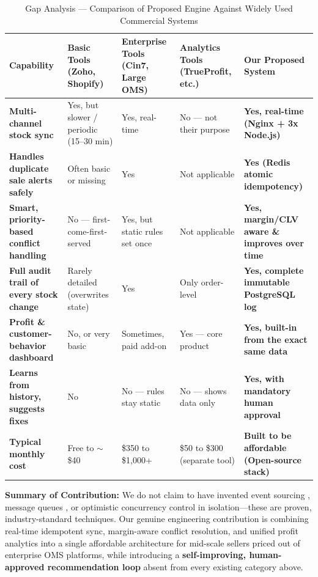 \documentclass[oneside,a4paper,12pt]{report}
\begin{document}
\begin{table}[!htbp]
\centering
\footnotesize
\renewcommand{\arraystretch}{1.4}
\begin{tabularx}{\textwidth}{|p{3.1cm}|X|X|X|X|}
\hline
\textbf{Capability} & \textbf{Basic Tools (Zoho, Shopify)} & \textbf{Enterprise Tools (Cin7, Large OMS)} & \textbf{Analytics Tools (TrueProfit, etc.)} & \textbf{Our Proposed System} \\ \hline
\textbf{Multi-channel stock sync} & Yes, but slower / periodic (15--30 min) & Yes, real-time & No — not their purpose & \textbf{Yes, real-time (Nginx + 3x Node.js)} \\ \hline
\textbf{Handles duplicate sale alerts safely} & Often basic or missing & Yes & Not applicable & \textbf{Yes (Redis atomic idempotency)} \\ \hline
\textbf{Smart, priority-based conflict handling} & No — first-come-first-served & Yes, but static rules set once & Not applicable & \textbf{Yes, margin/CLV aware \& improves over time} \\ \hline
\textbf{Full audit trail of every stock change} & Rarely detailed (overwrites state) & Yes & Only order-level & \textbf{Yes, complete immutable PostgreSQL log} \\ \hline
\textbf{Profit \& customer-behavior dashboard} & No, or very basic & Sometimes, paid add-on & Yes — core product & \textbf{Yes, built-in from the exact same data} \\ \hline
\textbf{Learns from history, suggests fixes} & No & No — rules stay static & No — shows data only & \textbf{Yes, with mandatory human approval} \\ \hline
\textbf{Typical monthly cost} & Free to $\sim$\$40 & \$350 to \$1,000+ & \$50 to \$300 (separate tool) & \textbf{Built to be affordable (Open-source stack)} \\ \hline
\end{tabularx}
\caption{Gap Analysis — Comparison of Proposed Engine Against Widely Used Commercial Systems}
\label{tab:gap_analysis}
\end{table}

\noindent\textbf{Summary of Contribution:} We do not claim to have invented event sourcing \cite{fowler2005}, message queues \cite{kleppmann2017}, or optimistic concurrency control \cite{kung1981} in isolation—these are proven, industry-standard techniques. Our genuine engineering contribution is combining real-time idempotent sync, margin-aware conflict resolution, and unified profit analytics into a single affordable architecture for mid-scale sellers priced out of enterprise OMS platforms, while introducing a \textbf{self-improving, human-approved recommendation loop} absent from every existing category above.
\end{document}
